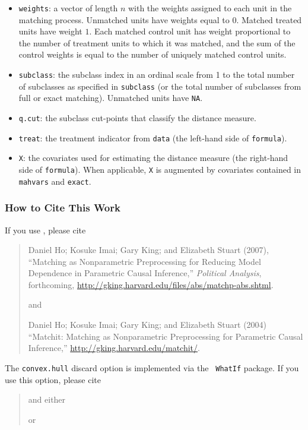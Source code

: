\begin{itemize}
\item \texttt{weights}: a vector of length $n$ with the weights
  assigned to each unit in the matching process.  Unmatched units have
  weights equal to $0$. Matched treated units have weight $1$.  Each
  matched control unit has weight proportional to the number of
  treatment units to which it was matched, and the sum of the control
  weights is equal to the number of uniquely matched control units.
 
\item \texttt{subclass}: the subclass index in an ordinal scale from 1
  to the total number of subclasses as specified in \texttt{subclass}
  (or the total number of subclasses from full or exact matching).
  Unmatched units have \texttt{NA}.
  
\item \texttt{q.cut}: the subclass cut-points that classify the
  distance measure.
  
\item \texttt{treat}: the treatment indicator from \texttt{data} (the
  left-hand side of \texttt{formula}).
 
\item \texttt{X}: the covariates used for estimating the distance
  measure (the right-hand side of \texttt{formula}).  When applicable,
  \texttt{X} is augmented by covariates contained in \texttt{mahvars}
  and \texttt{exact}.
\end{itemize}

\subsubsection{How to Cite This Work}

If you use \MatchIt, please cite\nocite{HoImaKin07,HoImaKin04}
\begin{verse}
  Daniel Ho; Kosuke Imai; Gary King; and Elizabeth Stuart (2007),
  ``Matching as Nonparametric Preprocessing for Reducing Model
  Dependence in Parametric Causal Inference,'' \emph{Political
    Analysis}, forthcoming,
  \url{http://gking.harvard.edu/files/abs/matchp-abs.shtml}.


and 

Daniel Ho; Kosuke Imai; Gary King; and Elizabeth Stuart (2004)
``Matchit: Matching as Nonparametric Preprocessing for Parametric
Causal Inference,'' \url{http://gking.harvard.edu/matchit/}.
\end{verse}

The {\tt convex.hull} discard option is implemented via the {\tt
  WhatIf} package.  If you use this option, please cite
\begin{verse}

and either


or

\end{verse} 

